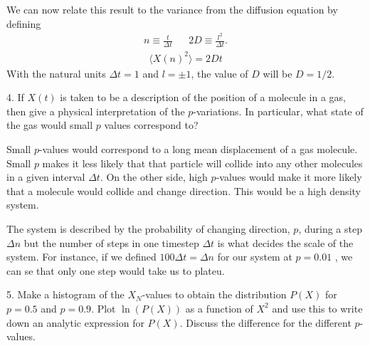 \documentclass[twocolumn]{article}[10pt]
\begin{document}
We can now relate this result to the variance from the diffusion equation by
defining 
\begin{align*}
n \equiv \frac{t}{\Delta t} && 2D \equiv \frac{l^2}{\Delta t}.
\end{align*}
\begin{align*}
\langle X(n)^2\rangle = 2Dt
\end{align*}
With the natural units $\Delta t = 1$ and $l = \pm1$, 
the value of $D$ will be $D = 1/2$.

{\color{black!70} 
4. If $X(t)$ is taken to be a description of the position of a molecule 
in a gas, then give a physical interpretation of the $p$-variations.
In particular, what state of the gas would small $p$ values 
correspond to?
}

Small $p$-values would correspond to a long mean displacement of a gas
molecule. Small $p$ makes it less likely that that particle will collide
into any other molecules in a given interval $\Delta t$. On the other 
side, high $p$-values would make it more likely that a molecule would
collide and change direction. This would be a high density system. 

The system is described by the probability of changing direction, $p$,
during a step $\Delta n$ but the number of steps in one timestep
$\Delta t$ is what decides the scale of the system. For instance,
if we defined $100\Delta t = \Delta n$ for our system at $p = 0.01$
, we can se that only one step would take us to plateu. 

{\color{black!70} 
5. Make a histogram of the $X_N$-values to obtain the distribution 
$P(X)$ for $p=0.5$ and $p = 0.9$. Plot $\ln(P(X))$ as a function
of $X^2$ and use this to write down an analytic expression for
$P(X)$. Discuss the difference for the different $p$-values. 
}
\end{document}
